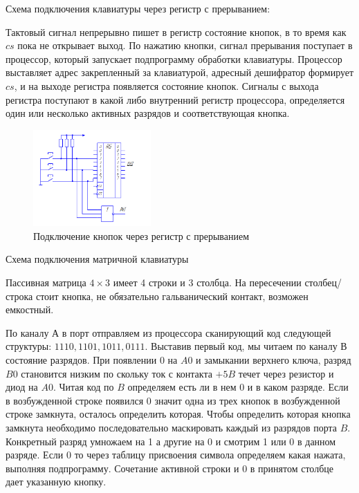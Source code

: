 \documentclass[unicode, 12pt, a4paper, oneside]{article}
\begin{document}
Схема подключения клавиатуры через регистр с прерыванием:

Тактовый сигнал непрерывно пишет в регистр состояние кнопок, в то время как $cs$ пока не открывает выход. По нажатию кнопки, сигнал прерывания поступает в процессор, который запускает подпрограмму обработки клавиатуры. Процессор выставляет адрес закрепленный за клавиатурой, адресный дешифратор формирует $cs$, и на выходе регистра появляется состояние кнопок. Сигналы с выхода регистра поступают в какой либо внутренний регистр процессора, определяется один или несколько активных разрядов и соответствующая кнопка. 

\begin{figure}[H]
\centering
\includegraphics[width=0.4\textwidth]{106_Button.png}
\caption{Подключение кнопок через регистр с прерыванием}
\end{figure}

Схема подключения матричной клавиатуры

Пассивная матрица $4\times 3$ имеет 4 строки и 3 столбца. На пересечении столбец/строка стоит кнопка, не обязательно гальванический контакт, возможен емкостный.

По каналу А в порт отправляем из процессора сканирующий код следующей структуры: $1110,{} 1101,{} 1011,{} 0111$. Выставив первый код, мы читаем по каналу В состояние разрядов. При появлении 0 на $A0$ и замыкании верхнего ключа, разряд $B0$ становится низким по скольку ток с контакта $+5B$ течет через резистор и диод на $A0$. Читая код по $B$ определяем есть ли в нем 0 и в каком разряде. Если в возбужденной строке появился 0 значит одна из трех кнопок в возбужденной строке замкнута, осталось определить которая. Чтобы определить которая кнопка замкнута необходимо последовательно маскировать каждый из разрядов порта $B$. Конкретный разряд умножаем на 1 а другие на 0 и смотрим 1 или 0 в данном разряде. Если 0 то через таблицу присвоения символа определяем какая нажата, выполняя подпрограмму. Сочетание активной строки и 0 в принятом столбце дает указанную кнопку.
\end{document}
